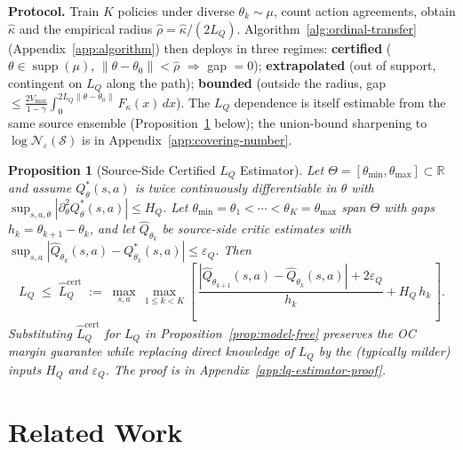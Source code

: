 \documentclass{article}
\newtheorem{proposition}{Proposition}
\newcommand{\R}{\mathbb{R}}
\newcommand{\cS}{\mathcal{S}}
\newcommand{\Vmax}{V_{\max}}
\begin{document}
\textbf{Protocol.} Train $K$ policies under diverse $\theta_k\sim\mu$, count action agreements, obtain $\hat\kappa$ and the empirical radius $\hat\rho=\hat\kappa/(2L_Q)$. Algorithm~\ref{alg:ordinal-transfer} (Appendix~\ref{app:algorithm}) then deploys in three regimes: \textbf{certified} ($\theta\in\operatorname{supp}(\mu)$, $\|\theta-\theta_0\|<\hat\rho$ $\Rightarrow$ gap $=0$); \textbf{extrapolated} (out of support, contingent on $L_Q$ along the path); \textbf{bounded} (outside the radius, gap $\leq \tfrac{2\Vmax}{1-\gamma}\int_0^{2L_Q\|\theta-\theta_0\|}F_\kappa(x)\,dx$). The $L_Q$ dependence is itself estimable from the same source ensemble (Proposition~\ref{prop:lq-estimator} below); the union-bound sharpening to $\log\mathcal{N}_\varepsilon(\cS)$ is in Appendix~\ref{app:covering-number}.

\begin{proposition}[Source-Side Certified $L_Q$ Estimator]
\label{prop:lq-estimator}
Let $\Theta = [\theta_{\min}, \theta_{\max}] \subset \R$ and assume $Q^*_\theta(s,a)$ is twice continuously differentiable in $\theta$ with $\sup_{s,a,\theta} |\partial^2_\theta Q^*_\theta(s,a)| \leq H_Q$. Let $\theta_{\min} = \theta_1 < \cdots < \theta_K = \theta_{\max}$ span $\Theta$ with gaps $h_k = \theta_{k+1} - \theta_k$, and let $\hat Q_{\theta_k}$ be source-side critic estimates with $\sup_{s,a} |\hat Q_{\theta_k}(s,a) - Q^*_{\theta_k}(s,a)| \leq \varepsilon_Q$. Then
\begin{equation}
\label{eq:lq-cert}
L_Q \;\leq\; \hat L_Q^{\mathrm{cert}} \;:=\; \max_{s,a}\,\max_{1 \leq k < K} \!\left[\,\frac{|\hat Q_{\theta_{k+1}}(s,a) - \hat Q_{\theta_k}(s,a)| + 2\varepsilon_Q}{h_k} + H_Q\, h_k\,\right].
\end{equation}
Substituting $\hat L_Q^{\mathrm{cert}}$ for $L_Q$ in Proposition~\ref{prop:model-free} preserves the OC margin guarantee while replacing direct knowledge of $L_Q$ by the (typically milder) inputs $H_Q$ and $\varepsilon_Q$. The proof is in Appendix~\ref{app:lq-estimator-proof}.
\end{proposition}



\section{Related Work}
\label{sec:related}
\end{document}
